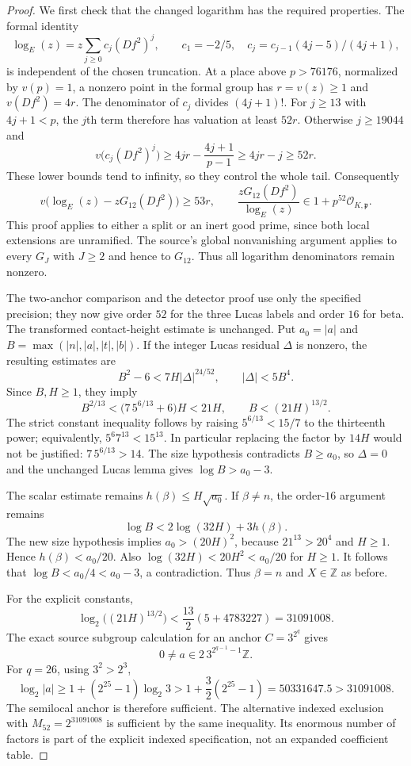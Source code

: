 \documentclass[11pt]{article}
\theoremstyle{definition}
\begin{document}
\begin{proof}
We first check that the changed logarithm has the required properties.
The formal identity
\[
 \log_E(z)=z\sum_{j\ge0}c_j(Df^2)^j,
 \qquad c_1=-2/5,\quad
 c_j=c_{j-1}(4j-5)/(4j+1),
\]
is independent of the chosen truncation.  At a place above
$p>76176$, normalized by $v(p)=1$, a nonzero point in the formal
group has $r=v(z)\ge1$ and $v(Df^2)=4r$.  The denominator of $c_j$
divides $(4j+1)!$.  For $j\ge13$ with $4j+1<p$, the $j$th term
therefore has valuation at least $52r$.  Otherwise $j\ge19044$ and
\[
 v\bigl(c_j(Df^2)^j\bigr)
 \ge4jr-\frac{4j+1}{p-1}
 \ge4jr-j\ge52r.
\]
These lower bounds tend to infinity, so they control the whole tail.
Consequently
\[
 v\bigl(\log_E(z)-zG_{12}(Df^2)\bigr)\ge53r,
 \qquad
 \frac{zG_{12}(Df^2)}{\log_E(z)}\in1+p^{52}\mathcal O_{K,\mathfrak p}.
\]
This proof applies to either a split or an inert good prime, since
both local extensions are unramified.  The source's global
nonvanishing argument applies to every $G_J$ with $J\ge2$ and hence
to $G_{12}$.  Thus all logarithm denominators remain nonzero.

The two-anchor comparison and the detector proof use only the
specified precision; they now give order $52$ for the three Lucas
labels and order $16$ for beta.  The transformed contact-height
estimate is unchanged.  Put $a_0=|a|$ and
$B=\max(|n|,|a|,|t|,|b|)$.  If the integer Lucas residual
$\Delta$ is nonzero, the resulting estimates are
\[
 B^2-6<7H|\Delta|^{24/52},\qquad |\Delta|<5B^4.
\]
Since $B,H\ge1$, they imply
\[
 B^{2/13}<\bigl(7\,5^{6/13}+6\bigr)H<21H,
 \qquad B<(21H)^{13/2}.
\]
The strict constant inequality follows by raising
$5^{6/13}<15/7$ to the thirteenth power; equivalently,
$5^6 7^{13}<15^{13}$.  In particular replacing the factor by
$14H$ would not be justified: $7\,5^{6/13}>14$.
The size hypothesis contradicts $B\ge a_0$, so $\Delta=0$ and
the unchanged Lucas lemma gives $\log B>a_0-3$.

The scalar estimate remains $h(\beta)\le H\sqrt{a_0}$.
If $\beta\ne n$, the order-$16$ argument remains
\[
 \log B<2\log(32H)+3h(\beta).
\]
The new size hypothesis implies $a_0>(20H)^2$, because
$21^{13}>20^4$ and $H\ge1$.  Hence
$h(\beta)<a_0/20$.  Also
$\log(32H)<20H^2<a_0/20$ for $H\ge1$.
It follows that $\log B<a_0/4<a_0-3$, a contradiction.  Thus
$\beta=n$ and $X\in\mathbb Z$ as before.

For the explicit constants,
\[
 \log_2\bigl((21H)^{13/2}\bigr)
 <\frac{13}{2}(5+4783227)=31091008.
\]
The exact source subgroup calculation for an anchor
$C=3^{2^q}$ gives
\[
 0\ne a\in2\,3^{2^{q-1}-1}\mathbb Z.
\]
For $q=26$, using $3^2>2^3$,
\[
 \log_2|a|\ge1+(2^{25}-1)\log_2 3
 >1+\frac32(2^{25}-1)=50331647.5>31091008.
\]
The semilocal anchor is therefore sufficient.  The alternative
indexed exclusion with $M_{52}=2^{31091008}$ is sufficient by the
same inequality.  Its enormous number of factors is part of the
explicit indexed specification, not an expanded coefficient table.


\end{proof}
\end{document}
